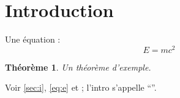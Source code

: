 \documentclass{article}
\newtheorem{theorem}{Th\'eor\`eme}
\begin{document}
\hsize=380pt
\section{Introduction}\label{sec:i}
Une \'equation :
\begin{equation}\label{eq:e}
E = m c^2
\end{equation}
\begin{theorem}\label{thm:t}
Un th\'eor\`eme d'exemple.
\end{theorem}
Voir \autoref{sec:i}, \cref{eq:e} et  ;
l'intro s'appelle ``''.
\end{document}
